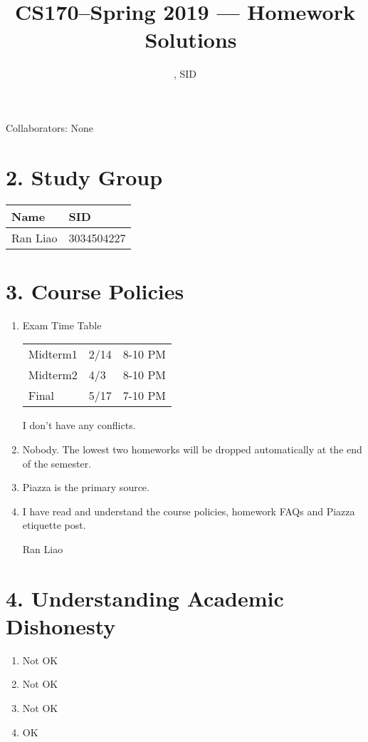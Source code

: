 \documentclass[11pt]{article}
\title{CS170--Spring 2019 --- Homework \Homework\ Solutions}
\author{\Name, SID \SID}
\date{}
\newenvironment{qparts}{\begin{enumerate}[{(}a{)}]}{\end{enumerate}}
\begin{document}
\maketitle
Collaborators: None

\section*{2. Study Group}
\begin{tabular}{ll}
    Name        &   SID         \\\hline
    Ran Liao    &   3034504227  \\   
\end{tabular}

\newpage
\section*{3. Course Policies}
\begin{qparts}
\item Exam Time Table

\begin{tabular}{lll}
    Midterm1    &   2/14    &   8-10 PM     \\   
    Midterm2    &   4/3     &   8-10 PM     \\   
    Final       &   5/17    &   7-10 PM     \\   
\end{tabular}

I don't have any conflicts.

\item Nobody. The lowest two homeworks will be dropped automatically at the end of the semester.

\item Piazza is the primary source.

\item I have read and understand the course policies, homework FAQs and Piazza etiquette post.

Ran Liao

\end{qparts}

\newpage
\section*{4. Understanding Academic Dishonesty}
\begin{qparts}
\item Not OK
\item Not OK
\item Not OK
\item OK

\end{qparts}
\end{document}
